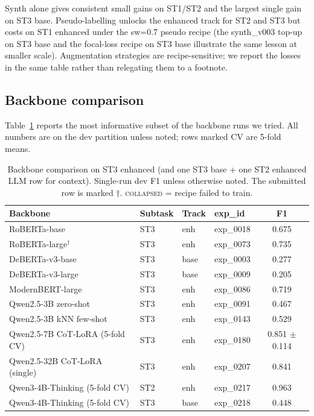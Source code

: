 Synth alone gives consistent small gains on ST1/ST2 and the largest single gain on ST3 base. Pseudo-labelling unlocks the enhanced track for ST2 and ST3 but costs on ST1 enhanced under the sw=0.7 pseudo recipe (the synth\_v003 top-up on ST3 base and the focal-loss recipe on ST3 base illustrate the same lesson at smaller scale). Augmentation strategies are recipe-sensitive; we report the losses in the same table rather than relegating them to a footnote.

\subsection{Backbone comparison}
\label{sec:backbone-results}

Table~\ref{tab:backbone} reports the most informative subset of the backbone runs we tried. All numbers are on the dev partition unless noted; rows marked CV are 5-fold means.

\begin{table}[h]
\centering
\small
\caption{Backbone comparison on ST3 enhanced (and one ST3 base + one ST2 enhanced
LLM row for context). Single-run dev F1 unless otherwise noted. The submitted
row is marked $\dagger$. \textsc{collapsed} = recipe failed to train.}
\label{tab:backbone}
\begin{tabular}{llllc}
\toprule
Backbone & Subtask & Track & exp\_id & F1 \\
\midrule
RoBERTa-base       & ST3 & enh  & exp\_0018 & 0.675 \\ %
RoBERTa-large$^{\dagger}$  & ST3 & enh  & exp\_0073 & 0.735 \\ %
DeBERTa-v3-base    & ST3 & base & exp\_0003 & 0.277 \\ %
DeBERTa-v3-large   & ST3 & base & exp\_0009 & 0.205 \\ %
ModernBERT-large   & ST3 & enh  & exp\_0086 & 0.719 \\ %
Qwen2.5-3B zero-shot      & ST3 & enh & exp\_0091 & 0.467 \\ %
Qwen2.5-3B kNN few-shot   & ST3 & enh & exp\_0143 & 0.529 \\ %
Qwen2.5-7B CoT-LoRA (5-fold CV)  & ST3 & enh  & exp\_0180 & 0.851 $\pm$ 0.114 \\ %
Qwen2.5-32B CoT-LoRA (single)    & ST3 & enh  & exp\_0207 & 0.841 \\ %
Qwen3-4B-Thinking (5-fold CV)    & ST2 & enh  & exp\_0217 & 0.963 \\ %
Qwen3-4B-Thinking (5-fold CV)    & ST3 & base & exp\_0218 & 0.448 \\ %
\bottomrule
\end{tabular}
\end{table}

